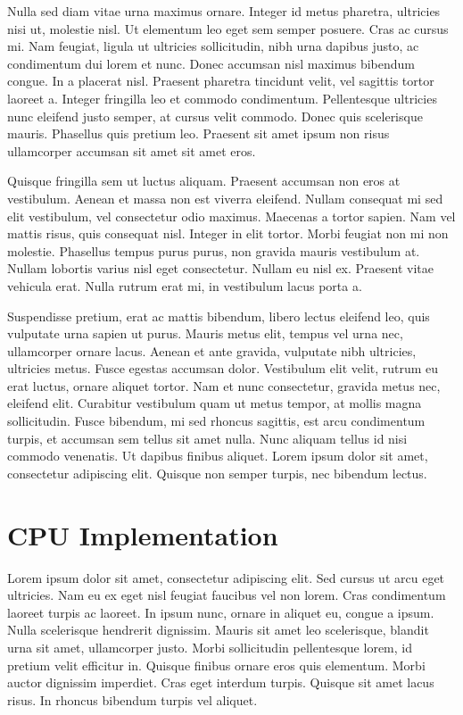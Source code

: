 \documentclass[a4paper,11pt]{kth-mag}
\begin{document}
Nulla sed diam vitae urna maximus ornare. Integer id metus pharetra, ultricies nisi ut, molestie nisl. Ut elementum leo eget sem semper posuere. Cras ac cursus mi. Nam feugiat, ligula ut ultricies sollicitudin, nibh urna dapibus justo, ac condimentum dui lorem et nunc. Donec accumsan nisl maximus bibendum congue. In a placerat nisl. Praesent pharetra tincidunt velit, vel sagittis tortor laoreet a. Integer fringilla leo et commodo condimentum. Pellentesque ultricies nunc eleifend justo semper, at cursus velit commodo. Donec quis scelerisque mauris. Phasellus quis pretium leo. Praesent sit amet ipsum non risus ullamcorper accumsan sit amet sit amet eros.

Quisque fringilla sem ut luctus aliquam. Praesent accumsan non eros at vestibulum. Aenean et massa non est viverra eleifend. Nullam consequat mi sed elit vestibulum, vel consectetur odio maximus. Maecenas a tortor sapien. Nam vel mattis risus, quis consequat nisl. Integer in elit tortor. Morbi feugiat non mi non molestie. Phasellus tempus purus purus, non gravida mauris vestibulum at. Nullam lobortis varius nisl eget consectetur. Nullam eu nisl ex. Praesent vitae vehicula erat. Nulla rutrum erat mi, in vestibulum lacus porta a.

Suspendisse pretium, erat ac mattis bibendum, libero lectus eleifend leo, quis vulputate urna sapien ut purus. Mauris metus elit, tempus vel urna nec, ullamcorper ornare lacus. Aenean et ante gravida, vulputate nibh ultricies, ultricies metus. Fusce egestas accumsan dolor. Vestibulum elit velit, rutrum eu erat luctus, ornare aliquet tortor. Nam et nunc consectetur, gravida metus nec, eleifend elit. Curabitur vestibulum quam ut metus tempor, at mollis magna sollicitudin. Fusce bibendum, mi sed rhoncus sagittis, est arcu condimentum turpis, et accumsan sem tellus sit amet nulla. Nunc aliquam tellus id nisi commodo venenatis. Ut dapibus finibus aliquet. Lorem ipsum dolor sit amet, consectetur adipiscing elit. Quisque non semper turpis, nec bibendum lectus.

\chapter{CPU Implementation}


Lorem ipsum dolor sit amet, consectetur adipiscing elit. Sed cursus ut arcu eget ultricies. Nam eu ex eget nisl feugiat faucibus vel non lorem. Cras condimentum laoreet turpis ac laoreet. In ipsum nunc, ornare in aliquet eu, congue a ipsum. Nulla scelerisque hendrerit dignissim. Mauris sit amet leo scelerisque, blandit urna sit amet, ullamcorper justo. Morbi sollicitudin pellentesque lorem, id pretium velit efficitur in. Quisque finibus ornare eros quis elementum. Morbi auctor dignissim imperdiet. Cras eget interdum turpis. Quisque sit amet lacus risus. In rhoncus bibendum turpis vel aliquet.
\end{document}

